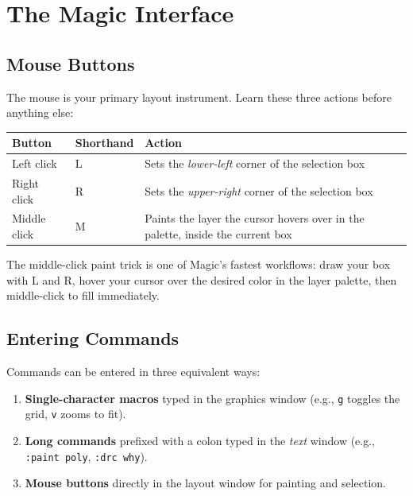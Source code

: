 \documentclass[11pt]{article}
\begin{document}
\section{The Magic Interface}

\subsection{Mouse Buttons}

The mouse is your primary layout instrument.
Learn these three actions before anything else:

\begin{center}
\begin{tabular}{@{}llp{8cm}@{}}
\toprule
\textbf{Button} & \textbf{Shorthand} & \textbf{Action} \\
\midrule
Left click   & L & Sets the \emph{lower-left} corner of the selection box \\
Right click  & R & Sets the \emph{upper-right} corner of the selection box \\
Middle click & M & Paints the layer the cursor hovers over in the palette,
                   inside the current box \\
\bottomrule
\end{tabular}
\end{center}

\begin{tipbox}
The middle-click paint trick is one of Magic's fastest workflows: draw
your box with L and R, hover your cursor over the desired color in the
layer palette, then middle-click to fill immediately.
\end{tipbox}

\subsection{Entering Commands}

Commands can be entered in three equivalent ways:

\begin{enumerate}[leftmargin=2em]
  \item \textbf{Single-character macros} typed in the graphics window
        (e.g., \texttt{g} toggles the grid, \texttt{v} zooms to fit).
  \item \textbf{Long commands} prefixed with a colon typed in the
        \emph{text} window (e.g., \texttt{:paint poly},
        \texttt{:drc why}).
  \item \textbf{Mouse buttons} directly in the layout window for
        painting and selection.
\end{enumerate}
\end{document}
